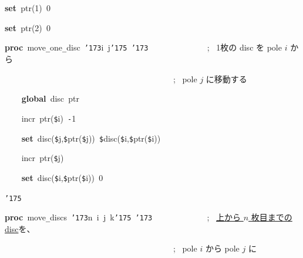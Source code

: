 \documentclass[a4paper,10pt]{article}
\def\mc{\relax}
\begin{document}
\noindent
\mbox{}\textbf{set}{\tt\mc \ }ptr(1){\tt\mc \ }0

\noindent
\mbox{}\textbf{set}{\tt\mc \ }ptr(2){\tt\mc \ }0

\noindent
\mbox{}\hfill

\noindent
\mbox{}\textbf{proc}{\tt\mc \ }move{\tt\_}one{\tt\_}disc{\tt\mc \ }{\tt\char'173}i{\tt\mc \ }j{\tt\char'175}{\tt\mc \ }{\tt\char'173}{\tt\mc \ }{\tt\mc \ }{\tt\mc \ }{\tt\mc \ }{\tt\mc \ }{\tt\mc \ }{\tt\mc \ }{\tt\mc \ }{\tt\mc \ }{\tt\mc \ }{\tt\mc \ }{\tt\mc \ }{\tt\mc \ }{\tt\mc \ };\rm\mc {\tt\#} \ 1枚の disc を pole $i$ から\hfill 
\tt\mc 

\noindent
\mbox{}{\tt\mc \ }{\tt\mc \ }{\tt\mc \ }{\tt\mc \ }{\tt\mc \ }{\tt\mc \ }{\tt\mc \ }{\tt\mc \ }{\tt\mc \ }{\tt\mc \ }{\tt\mc \ }{\tt\mc \ }{\tt\mc \ }{\tt\mc \ }{\tt\mc \ }{\tt\mc \ }{\tt\mc \ }{\tt\mc \ }{\tt\mc \ }{\tt\mc \ }{\tt\mc \ }{\tt\mc \ }{\tt\mc \ }{\tt\mc \ }{\tt\mc \ }{\tt\mc \ }{\tt\mc \ }{\tt\mc \ }{\tt\mc \ }{\tt\mc \ }{\tt\mc \ }{\tt\mc \ }{\tt\mc \ }{\tt\mc \ }{\tt\mc \ }{\tt\mc \ }{\tt\mc \ }{\tt\mc \ }{\tt\mc \ }{\tt\mc \ };\rm\mc {\tt\#} \ pole $j$ に移動する \hfill 
\tt\mc 

\noindent
\mbox{}{\tt\mc \ }{\tt\mc \ }{\tt\mc \ }{\tt\mc \ }\textbf{global}{\tt\mc \ }disc{\tt\mc \ }ptr

\noindent
\mbox{}{\tt\mc \ }{\tt\mc \ }{\tt\mc \ }{\tt\mc \ }incr{\tt\mc \ }ptr({\tt\$}i){\tt\mc \ }{\tt -}1

\noindent
\mbox{}{\tt\mc \ }{\tt\mc \ }{\tt\mc \ }{\tt\mc \ }\textbf{set}{\tt\mc \ }disc({\tt\$}j,{\tt\$}ptr({\tt\$}j)){\tt\mc \ }{\tt\$}disc({\tt\$}i,{\tt\$}ptr({\tt\$}i))

\noindent
\mbox{}{\tt\mc \ }{\tt\mc \ }{\tt\mc \ }{\tt\mc \ }incr{\tt\mc \ }ptr({\tt\$}j)

\noindent
\mbox{}{\tt\mc \ }{\tt\mc \ }{\tt\mc \ }{\tt\mc \ }\textbf{set}{\tt\mc \ }disc({\tt\$}i,{\tt\$}ptr({\tt\$}i)){\tt\mc \ }0

\noindent
\mbox{}{\tt\char'175}

\noindent
\mbox{}\hfill

\noindent
\mbox{}\textbf{proc}{\tt\mc \ }move{\tt\_}discs{\tt\mc \ }{\tt\char'173}n{\tt\mc \ }i{\tt\mc \ }j{\tt\mc \ }k{\tt\char'175}{\tt\mc \ }{\tt\char'173}{\tt\mc \ }{\tt\mc \ }{\tt\mc \ }{\tt\mc \ }{\tt\mc \ }{\tt\mc \ }{\tt\mc \ }{\tt\mc \ }{\tt\mc \ }{\tt\mc \ }{\tt\mc \ }{\tt\mc \ }{\tt\mc \ };\rm\mc {\tt\#} \ \underline{\textsf{上から $n$ 枚目までの disc}}を、\hfill 
\tt\mc 

\noindent
\mbox{}{\tt\mc \ }{\tt\mc \ }{\tt\mc \ }{\tt\mc \ }{\tt\mc \ }{\tt\mc \ }{\tt\mc \ }{\tt\mc \ }{\tt\mc \ }{\tt\mc \ }{\tt\mc \ }{\tt\mc \ }{\tt\mc \ }{\tt\mc \ }{\tt\mc \ }{\tt\mc \ }{\tt\mc \ }{\tt\mc \ }{\tt\mc \ }{\tt\mc \ }{\tt\mc \ }{\tt\mc \ }{\tt\mc \ }{\tt\mc \ }{\tt\mc \ }{\tt\mc \ }{\tt\mc \ }{\tt\mc \ }{\tt\mc \ }{\tt\mc \ }{\tt\mc \ }{\tt\mc \ }{\tt\mc \ }{\tt\mc \ }{\tt\mc \ }{\tt\mc \ }{\tt\mc \ }{\tt\mc \ }{\tt\mc \ }{\tt\mc \ };\rm\mc {\tt\#} \ pole $i$ から pole $j$ に\hfill 
\tt\mc 
\end{document}
